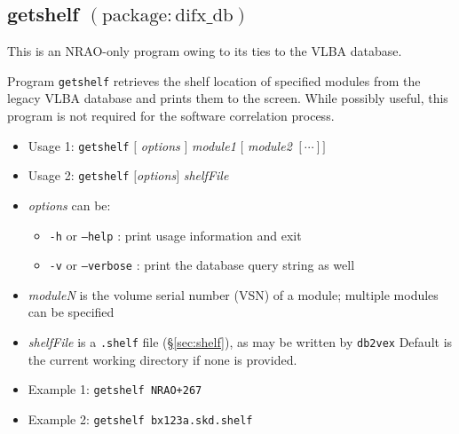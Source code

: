 






\subsection{getshelf {\small $\mathrm{(package: difx\_db)}$}} \label{sec:getshelf}

This is an NRAO-only program owing to its ties to the VLBA database.

Program {\tt getshelf} retrieves the shelf location of specified modules from the legacy VLBA database and prints them to the screen.
While possibly useful, this program is not required for the software correlation process.

\begin{itemize}
\item[] Usage 1: {\tt getshelf} $[$ {\em options} $]$ {\em module1} $[$ {\em module2} $[ \cdots ] ]$
\item[] Usage 2: {\tt getshelf} $[${\em options}$]$ {\em shelfFile}
\item[] {\em options} can be:
\begin{itemize}
\item[] {\tt -h} or {\tt --help} : print usage information and exit
\item[] {\tt -v} or {\tt --verbose} : print the database query string as well
\end{itemize}
\item[] {\em moduleN} is the volume serial number (VSN) of a module; multiple modules can be specified
\item[] {\em shelfFile} is a {\tt .shelf} file (\S\ref{sec:shelf}), as may be written by {\tt db2vex}
Default is the current working directory if none is provided.
\item[] Example 1: {\tt getshelf NRAO+267}
\item[] Example 2: {\tt getshelf bx123a.skd.shelf}
\end{itemize}









